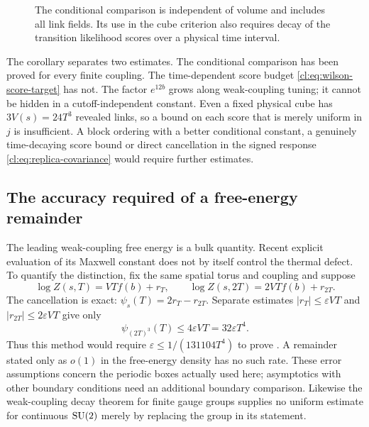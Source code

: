 \begin{figure}[htbp]
\centering
{}
\caption{The conditional comparison is independent of volume and includes
all link fields. Its use in the cube criterion also requires decay of
the transition likelihood scores over a physical time interval.}
\label{cl:fig:fisher}
\end{figure}

The corollary separates two estimates. The conditional comparison has
been proved for every finite coupling. The time-dependent score budget
\eqref{cl:eq:wilson-score-target} has not. The factor $e^{12b}$ grows
along weak-coupling tuning; it cannot be hidden in a cutoff-independent
constant. Even a fixed physical cube has $3V(s)=24T^3$ revealed links,
so a bound on each score that is merely uniform in $j$ is insufficient.
A block ordering with a better conditional constant, a genuinely
time-decaying score bound or direct cancellation in the signed response
\eqref{cl:eq:replica-covariance} would require further estimates.

\subsection{The accuracy required of a free-energy remainder}
The leading weak-coupling free energy is a bulk quantity. Recent explicit
evaluation of its Maxwell constant \cite{Bre26} does not by itself
control the thermal defect. To quantify the distinction, fix the same
spatial torus and coupling and suppose
\[
\log Z(s,T)=VTf(b)+r_T,\qquad
\log Z(s,2T)=2VTf(b)+r_{2T}.
\]
The cancellation is exact: $\psi_s(T)=2r_T-r_{2T}$. Separate estimates
$|r_T|\le\varepsilon VT$ and $|r_{2T}|\le2\varepsilon VT$ give only
\[
\psi_{(2T)^3}(T)\le4\varepsilon VT=32\varepsilon T^4.
\]
Thus this method would require $\varepsilon\le1/(131104T^4)$ to prove
\Mcirc{}. A remainder stated only as $o(1)$ in the free-energy density
has no such rate. These error assumptions concern the periodic boxes
actually used here; asymptotics with other boundary conditions need an
additional boundary comparison. Likewise the weak-coupling decay theorem
for finite gauge groups \cite{AC25} supplies no uniform estimate for
continuous $\mathrm{SU}(2)$ merely by replacing the group in its statement.

